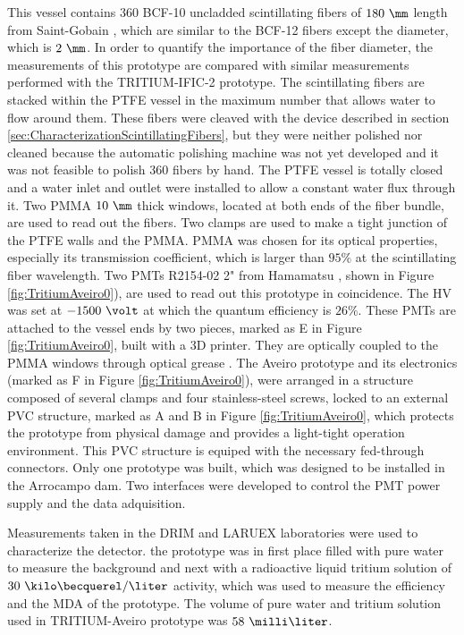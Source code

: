This vessel contains $360$ BCF-10 uncladded scintillating fibers of $180~\mm$ length from Saint-Gobain \cite{DataSheetBCF12Fiber}, which are similar to the BCF-12 fibers except the diameter, which is $2~\mm$. In order to quantify the importance of the fiber diameter, the measurements of this prototype are compared with similar measurements performed with the TRITIUM-IFIC-2 prototype. The scintillating fibers are stacked within the PTFE vessel in the maximum number that allows water to flow around them. These fibers were cleaved with the device described in section \ref{sec:CharacterizationScintillatingFibers}, but they were neither polished nor cleaned because the automatic polishing machine was not yet developed and it was not feasible to polish 360 fibers by hand. The PTFE vessel is totally closed and  a water inlet and outlet were installed to allow a constant water flux through it. Two PMMA $10~\mm$ thick windows, located at both ends of the fiber bundle, are used to read out the fibers. Two clamps are used to make a tight junction of the PTFE walls and the PMMA. PMMA was chosen for its optical properties, especially its transmission coefficient, which is larger than $95\%$ at the scintillating fiber wavelength. Two PMTs R2154-02 2" from Hamamatsu \cite{DataSheetPMTsAveiro}, shown in Figure \ref{fig:TritiumAveiro0}), are used to read out this prototype in coincidence. The HV was set at $-1500~\volt$ at which the quantum efficiency is $26\%$. These PMTs are attached to the vessel ends by two pieces, marked as E in Figure \ref{fig:TritiumAveiro0}, built with a 3D printer. They are optically coupled to the PMMA windows through optical grease \cite{OpticalGrease}. The Aveiro prototype and its electronics (marked as F in Figure \ref{fig:TritiumAveiro0}), were arranged in a structure composed of several clamps and four stainless-steel screws, locked to an external PVC structure, marked as A and B in Figure \ref{fig:TritiumAveiro0}, which protects the prototype from physical damage and provides a light-tight operation environment. This PVC structure is equiped with the necessary fed-through connectors. Only one prototype was built, which was designed to be installed in the Arrocampo dam. Two interfaces were developed to control the PMT power supply and the data adquisition. 

Measurements taken in the DRIM and LARUEX laboratories were used to characterize the detector. the prototype was in first place filled with pure water to measure the background and next with a radioactive liquid tritium solution of $30~\kilo\becquerel/\liter$ activity, which was used to measure the efficiency and the MDA of the prototype. The volume of pure water and tritium solution used in TRITIUM-Aveiro prototype was $58~\milli\liter$. 

